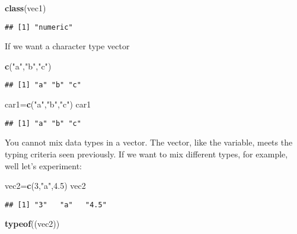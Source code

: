 \documentclass[
]{article}
\newenvironment{Shaded}{\begin{snugshade}}{\end{snugshade}}
\newcommand{\DecValTok}[1]{\textcolor[rgb]{0.00,0.00,0.81}{#1}}
\newcommand{\FloatTok}[1]{\textcolor[rgb]{0.00,0.00,0.81}{#1}}
\newcommand{\FunctionTok}[1]{\textcolor[rgb]{0.13,0.29,0.53}{\textbf{#1}}}
\newcommand{\NormalTok}[1]{#1}
\newcommand{\OtherTok}[1]{\textcolor[rgb]{0.56,0.35,0.01}{#1}}
\newcommand{\StringTok}[1]{\textcolor[rgb]{0.31,0.60,0.02}{#1}}
\begin{document}
\begin{Shaded}
\begin{Highlighting}[]
\FunctionTok{class}\NormalTok{(vec1)}
\end{Highlighting}
\end{Shaded}

\begin{verbatim}
## [1] "numeric"
\end{verbatim}

If we want a character type vector

\begin{Shaded}
\begin{Highlighting}[]
\FunctionTok{c}\NormalTok{(}\StringTok{"a"}\NormalTok{,}\StringTok{"b"}\NormalTok{,}\StringTok{"c"}\NormalTok{)}
\end{Highlighting}
\end{Shaded}

\begin{verbatim}
## [1] "a" "b" "c"
\end{verbatim}

\begin{Shaded}
\begin{Highlighting}[]
\NormalTok{car1}\OtherTok{=}\FunctionTok{c}\NormalTok{(}\StringTok{"a"}\NormalTok{,}\StringTok{"b"}\NormalTok{,}\StringTok{"c"}\NormalTok{)}
\NormalTok{car1}
\end{Highlighting}
\end{Shaded}

\begin{verbatim}
## [1] "a" "b" "c"
\end{verbatim}

You cannot mix data types in a vector. The vector, like the variable,
meets the typing criteria seen previously. If we want to mix different
types, for example, well let's experiment:

\begin{Shaded}
\begin{Highlighting}[]
\NormalTok{vec2}\OtherTok{=}\FunctionTok{c}\NormalTok{(}\DecValTok{3}\NormalTok{,}\StringTok{"a"}\NormalTok{,}\FloatTok{4.5}\NormalTok{)}
\NormalTok{vec2}
\end{Highlighting}
\end{Shaded}

\begin{verbatim}
## [1] "3"   "a"   "4.5"
\end{verbatim}

\begin{Shaded}
\begin{Highlighting}[]
\FunctionTok{typeof}\NormalTok{((vec2))}
\end{Highlighting}
\end{Shaded}
\end{document}
